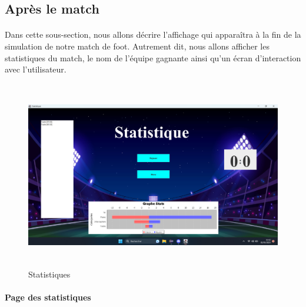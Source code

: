     

\subsection{Après le match}

\paragraph{} 
    Dans cette sous-section, nous allons décrire l'affichage qui apparaîtra à la fin de la simulation de notre match de foot. Autrement dit, nous allons afficher les statistiques du match, le nom de l'équipe gagnante ainsi qu'un écran d'interaction avec l'utilisateur.

\begin{figure}[h]
\centering
\includegraphics[width=12.82cm, height=8.2cm]{images/Statistiques.png}
\caption{Statistiques}
\label{fig:stats}
\end{figure}

    \vspace{15pt}

\paragraph{Page des statistiques}

